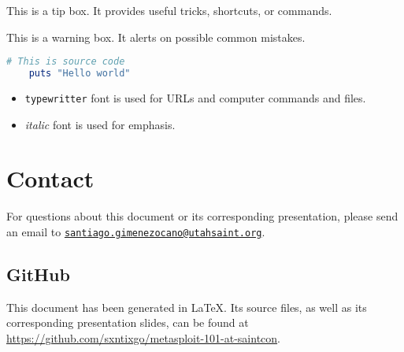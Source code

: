 \begin{tipbox}
    This is a tip box. It provides useful tricks, shortcuts, or commands.
\end{tipbox}

\begin{warnbox}
    This is a warning box. It alerts on possible common mistakes.
\end{warnbox}

\begin{listingbox}
    \begin{lstlisting}[language=ruby]
    # This is source code
    puts "Hello world"
    \end{lstlisting}    
    \end{listingbox}

\begin{itemize}
    \item[] \texttt{typewritter} font is used for URLs and computer commands and files.
    \item[] \textit{italic} font is used for emphasis. 
\end{itemize}


\section*{Contact}

For questions about this document or its corresponding presentation, please send an email to \href{mailto:santiago.gimenezocano@utahsaint.org}{\texttt{santiago.gimenezocano@utahsaint.org}}.

\subsection*{GitHub}

This document has been generated in \LaTeX. Its source files, as well as its corresponding presentation slides, can be found at \url{https://github.com/sxntixgo/metasploit-101-at-saintcon}.